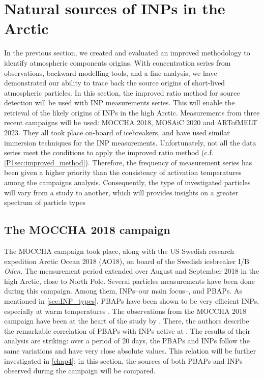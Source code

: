 \section{Natural sources of INPs in the Arctic}
\label{sec:INP_sources}
In the previous section, we created and evaluated an improved methodology to identify atmospheric components origins. 
With concentration series from observations, backward modelling tools, and a fine analysis, we have demonstrated our ability to trace back the source origins of short-lived atmospheric particles.
In this section, the improved ratio method for source detection will be used with INP measurements series. 
This will enable the retrieval of the likely origins of INPs in the high Arctic.
Measurements from three recent campaigns will be used: MOCCHA 2018, MOSAiC 2020 and ARTofMELT 2023. They all took place on-board of icebreakers, and have used similar immersion techniques for the INP measurements.
Unfortunately, not all the data series meet the conditions to apply the improved ratio method (c.f. \cref{P1sec:improved_method}). Therefore, the frequency of measurement series has been given a higher priority than the consistency of activation temperatures among the campaigns analysis. Consequently, the type of investigated particles will vary from a study to another, which will provides insights on a greater spectrum of particle types 

    \subsection{The MOCCHA 2018 campaign}
        \label{sec:source_INP_moccha}
        The MOCCHA campaign took place, along with the US-Swedish research expedition Arctic Ocean 2018 (AO18), on board of the Swedish icebreaker I/B \textit{Oden}. The measurement period extended over August and September 2018 in the high Arctic, close to North Pole.
        Several particles measurements have been done during this campaign. Among them, INPs\---our main focus\---, and PBAPs.
        As mentioned in \cref{sec:INP_types}, PBAPs have been shown to be very efficient INPs, especially at warm temperatures \citep{pereira_freitas_regionally_2023}. The observations from the MOCCHA 2018 campaign have been at the heart of the study by \citet{kojoj_arctic_2024}. There, the authors describe the remarkable correlation of PBAPs with INPs active at .
        The results of their analysis are striking: over a period of 20 days, the PBAPs and INPs follow the same variations and have very close absolute values.
        This relation will be further investigated in \cref{chap4}; in this section, the sources of both PBAPs and INPs observed during the campaign will be compared.

